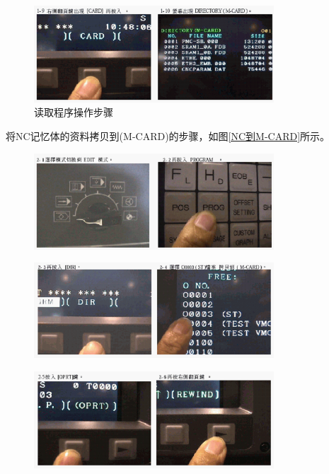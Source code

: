 \begin{figure}[!hbtp]
	\centering	\includegraphics[width=0.8\textwidth]{images/14-11}
	\caption{读取程序操作步骤} \label{读取程序操作步骤}
\end{figure}

将NC记忆体的资料拷贝到(M-CARD)的步骤，如图\ref{NC到M-CARD}所示。

\begin{figure}[!hbtp]
	\centering	\includegraphics[width=0.8\textwidth]{images/14-12}
\end{figure}

\begin{figure}[!hbtp]
	\centering	\includegraphics[width=0.8\textwidth]{images/14-13}
\end{figure}

\begin{figure}[!hbtp]
	\centering	\includegraphics[width=0.8\textwidth]{images/14-14}
\end{figure}

